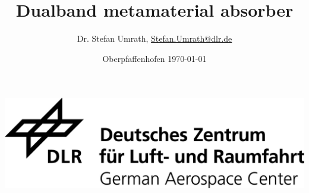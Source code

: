 \documentclass[a4paper,12pt]{scrartcl}  %
\title{Dualband metamaterial absorber}
\author[1]{Dr. Stefan Umrath, \href{mailto:Stefan.Umrath@dlr.de}{Stefan.Umrath@dlr.de}}
\affil[1]{German Aerospace Center (DLR)}
\date{Oberpfaffenhofen \today{} \vspace{3cm}}
\begin{document}
\maketitle
\begin{center}
\includegraphics[width= 0.75\linewidth]{./media/DLR_Logo_engl_schwarz.jpg}
\end{center}

\newpage
\tableofcontents 
\newpage


\newpage

\newpage

\newpage




\newpage


\printbibliography
\end{document}

